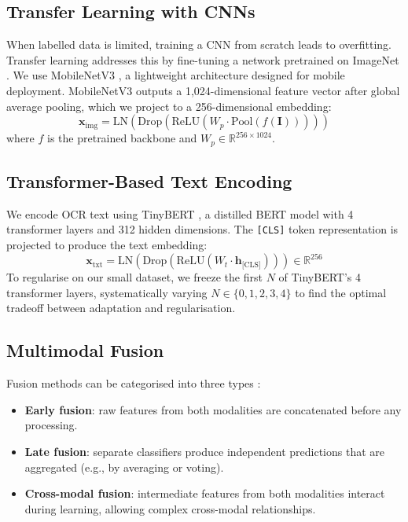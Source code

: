 \documentclass[10pt,twocolumn]{article}
\begin{document}
\subsection{Transfer Learning with CNNs}

When labelled data is limited, training a CNN from scratch leads to overfitting. Transfer learning addresses this by fine-tuning a network pretrained on ImageNet \citep{krizhevsky2012imagenet}. We use MobileNetV3 \citep{howard2019mobilenet}, a lightweight architecture designed for mobile deployment. MobileNetV3 outputs a 1,024-dimensional feature vector after global average pooling, which we project to a 256-dimensional embedding:
\begin{equation}
    \mathbf{x}_{\text{img}} = \text{LN}(\text{Drop}(\text{ReLU}(W_p \cdot \text{Pool}(f(\mathbf{I})))))
\end{equation}
where $f$ is the pretrained backbone and $W_p \in \mathbb{R}^{256 \times 1024}$.

\subsection{Transformer-Based Text Encoding}

We encode OCR text using TinyBERT \citep{jiao2020tinybert}, a distilled BERT model \citep{devlin2019bert} with 4 transformer layers and 312 hidden dimensions. The \texttt{[CLS]} token representation is projected to produce the text embedding:
\begin{equation}
    \mathbf{x}_{\text{txt}} = \text{LN}(\text{Drop}(\text{ReLU}(W_t \cdot \mathbf{h}_{\text{[CLS]}}))) \in \mathbb{R}^{256}
\end{equation}
To regularise on our small dataset, we freeze the first $N$ of TinyBERT's 4 transformer layers, systematically varying $N \in \{0, 1, 2, 3, 4\}$ to find the optimal tradeoff between adaptation and regularisation.

\subsection{Multimodal Fusion}

Fusion methods can be categorised into three types \citep{pettersson2024multimodal}:

\begin{itemize}[nosep,leftmargin=*]
    \item \textbf{Early fusion}: raw features from both modalities are concatenated before any processing.
    \item \textbf{Late fusion}: separate classifiers produce independent predictions that are aggregated (e.g., by averaging or voting).
    \item \textbf{Cross-modal fusion}: intermediate features from both modalities interact during learning, allowing complex cross-modal relationships.
\end{itemize}
\end{document}
